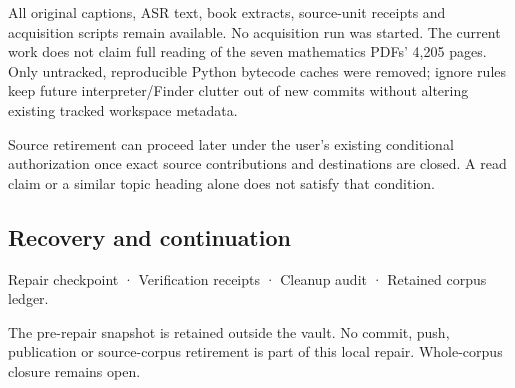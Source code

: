 All original captions, ASR text, book extracts, source-unit receipts and acquisition scripts remain available. No acquisition run was started. The current work does not claim full reading of the seven mathematics PDFs' 4,205 pages. Only untracked, reproducible Python bytecode caches were removed; ignore rules keep future interpreter/Finder clutter out of new commits without altering existing tracked workspace metadata.

Source retirement can proceed later under the user's existing conditional authorization once exact source contributions and destinations are closed. A read claim or a similar topic heading alone does not satisfy that condition.

\subsection{Recovery and continuation}\label{appendix-faa2b5a8e820-recovery-and-continuation}

\hypertarget{appendix-faa2b5a8e820-recovery-and-continuation}{}

{Repair checkpoint} · {Verification receipts} · {Cleanup audit} · {Retained corpus ledger}.

The pre-repair snapshot is retained outside the vault. No commit, push, publication or source-corpus retirement is part of this local repair. Whole-corpus closure remains open.
